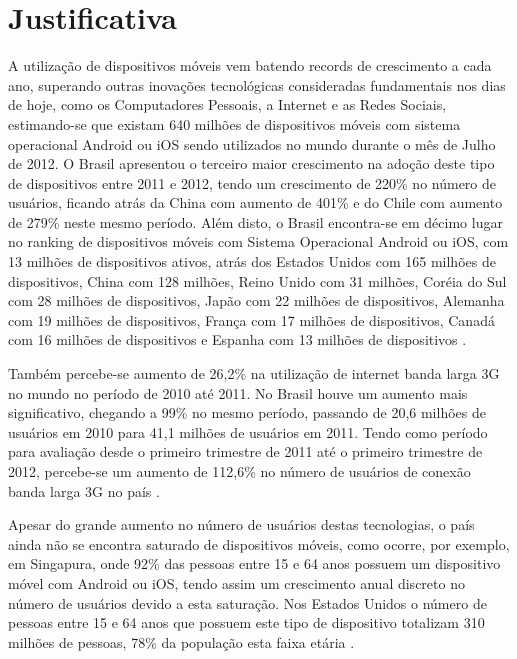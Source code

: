 \chapter{Justificativa}

A utilização de dispositivos móveis vem batendo records de crescimento a cada ano, superando outras inovações tecnológicas consideradas fundamentais nos dias de hoje, como os Computadores Pessoais, a Internet e as Redes Sociais, estimando-se que existam 640 milhões de dispositivos móveis com sistema operacional Android ou iOS sendo utilizados no mundo durante o mês de Julho de 2012. O Brasil apresentou o terceiro maior crescimento na adoção deste tipo de dispositivos entre 2011 e 2012, tendo um crescimento de 220\% no número de usuários, ficando atrás da China com aumento de 401\% e do Chile com aumento de 279\% neste mesmo período. Além disto, o Brasil encontra-se em décimo lugar no ranking de dispositivos móveis com Sistema Operacional Android ou iOS, com 13 milhões de dispositivos ativos, atrás dos Estados Unidos com 165 milhões de dispositivos, China com 128 milhões, Reino Unido com 31 milhões, Coréia do Sul com 28 milhões de dispositivos, Japão com 22 milhões de dispositivos, Alemanha com 19 milhões de dispositivos, França com 17 milhões de dispositivos, Canadá com 16 milhões de dispositivos e Espanha com 13 milhões de dispositivos
\cite{flurry2012}.

Também percebe-se aumento de 26,2\% na utilização de internet banda larga 3G no mundo no período de 2010 até 2011. No Brasil houve um aumento mais significativo, chegando a 99\% no mesmo período, passando de 20,6 milhões de usuários em 2010 para 41,1 milhões de usuários em 2011. Tendo como período para avaliação desde o primeiro trimestre de 2011 até o primeiro trimestre de 2012, percebe-se um aumento de 112,6\% no número de usuários de conexão banda larga 3G no país \cite{Huawei1T2012}.

Apesar do grande aumento no número de usuários destas tecnologias, o país ainda não se encontra saturado de dispositivos móveis, como ocorre, por exemplo, em Singapura, onde 92\% das pessoas entre 15 e 64 anos possuem um dispositivo móvel com Android ou iOS, tendo assim um crescimento anual discreto no número de usuários devido a esta saturação. Nos Estados Unidos o número de pessoas entre 15 e 64 anos que possuem este tipo de dispositivo totalizam 310 milhões de pessoas, 78\% da população esta faixa etária \cite{flurry2012}.

